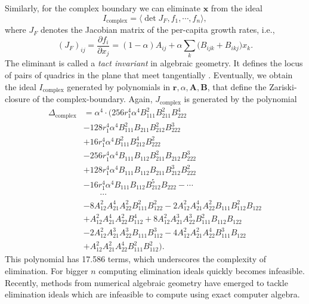 \documentclass[pdflatex,sn-mathphys-num]{sn-jnl}%
\begin{document}
Similarly, for the complex boundary we can eliminate $\mathbf x$ from the ideal
$$I_\text{complex} = \langle \det J_F, f_1,\cdots,f_n\rangle,$$
where $J_F$ denotes the Jacobian matrix of the per-capita growth rates, i.e.,
\begin{equation}
 (J_F)_{ij} = \frac{\partial f_i}{\partial x_j} = (1-\alpha)A_{ij} + \alpha \sum_k \bigl( B_{ijk} + B_{ikj} \bigr) x_k.
 \label{eq:JF_def}
\end{equation}
The eliminant is called a \emph{tact invariant} in algebraic geometry. It defines the locus of pairs of quadrics in the plane that meet tangentially \cite{breiding_3264_2019}. Eventually, we obtain the ideal $I_\text{complex}$ generated by polynomials in $\mathbf r, \alpha, \mathbf A, \mathbf B$, that define the Zariski-closure of the complex-boundary. Again, $J_\text{complex}$ is generated by the polynomial
{\small
\begin{align*}
\Delta_\text{complex}& = \alpha^4 \cdot \big(256r_1^4\alpha^4B_{111}^2B_{211}^2B_{222}^4\\
&-128r_1^4\alpha^4B_{111}^2B_{211}B_{212}^2B_{222}^3\\
&+16r_1^4\alpha^4B_{111}^2B_{212}^4B_{222}^2\\
&-256r_1^4\alpha^4B_{111}B_{112}B_{211}^2B_{212}B_{222}^3\\
&+128r_1^4\alpha^4B_{111}B_{112}B_{211}B_{212}^3B_{222}^2\\
&-16r_1^4\alpha^4B_{111}B_{112}B_{212}^5B_{222} - \cdots \\
&\qquad \cdots \\
& - 8A_{12}^2A_{21}^4A_{22}^2B_{111}^2B_{122}^2-2A_{12}^2A_{21}^4A_{22}^2B_{111}B_{112}^2B_{122}\\
&+A_{12}^2A_{21}^4A_{22}^2B_{112}^4+8A_{12}^2A_{21}^3A_{22}^3B_{111}^2B_{112}B_{122}\\
&-2A_{12}^2A_{21}^3A_{22}^3B_{111}B_{112}^3-4A_{12}^2A_{21}^2A_{22}^4B_{111}^3B_{122}\\
&+A_{12}^2A_{21}^2A_{22}^4B_{111}^2B_{112}^2\big).  
\end{align*}}
This polynomial has 17.586 terms, which underscores the complexity of elimination. For bigger $n$ computing elimination ideals quickly becomes infeasible. Recently, methods from numerical algebraic geometry have emerged to tackle elimination ideals \cite{breiding_elimination_2026} which are infeasible to compute using exact computer algebra. 

  
\end{document}
